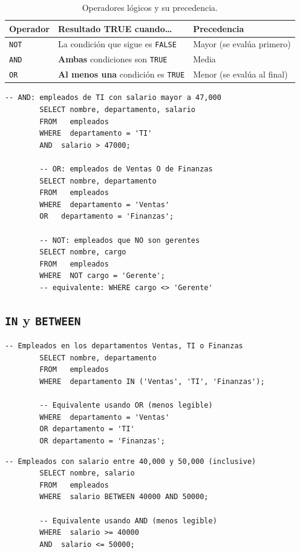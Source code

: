 \documentclass[12pt, a4paper]{article}
\begin{document}
	\begin{table}[H]
		\centering
		\small
		\renewcommand{\arraystretch}{1.5}
		\begin{tabularx}{\linewidth}{@{} l X X @{}}
			\toprule
			\textbf{Operador} & \textbf{Resultado TRUE cuando\ldots} & \textbf{Precedencia} \\
			\midrule
			\texttt{NOT} & La condición que sigue es \texttt{FALSE}
			& Mayor (se evalúa primero) \\
			\texttt{AND} & \textbf{Ambas} condiciones son \texttt{TRUE}
			& Media \\
			\texttt{OR}  & \textbf{Al menos una} condición es \texttt{TRUE}
			& Menor (se evalúa al final) \\
			\bottomrule
		\end{tabularx}
		\caption{Operadores lógicos y su precedencia.}
		\label{tab:operadores-logicos}
	\end{table}
	
	\begin{lstlisting}[caption={Uso de AND, OR y NOT.}]
		-- AND: empleados de TI con salario mayor a 47,000
		SELECT nombre, departamento, salario
		FROM   empleados
		WHERE  departamento = 'TI'
		AND  salario > 47000;
		
		-- OR: empleados de Ventas O de Finanzas
		SELECT nombre, departamento
		FROM   empleados
		WHERE  departamento = 'Ventas'
		OR   departamento = 'Finanzas';
		
		-- NOT: empleados que NO son gerentes
		SELECT nombre, cargo
		FROM   empleados
		WHERE  NOT cargo = 'Gerente';
		-- equivalente: WHERE cargo <> 'Gerente'
	\end{lstlisting}
	
	\subsection{\texttt{IN} y \texttt{BETWEEN}}
	
	\begin{lstlisting}[caption={IN para búsquedas en conjuntos.}]
		-- Empleados en los departamentos Ventas, TI o Finanzas
		SELECT nombre, departamento
		FROM   empleados
		WHERE  departamento IN ('Ventas', 'TI', 'Finanzas');
		
		-- Equivalente usando OR (menos legible)
		WHERE  departamento = 'Ventas'
		OR departamento = 'TI'
		OR departamento = 'Finanzas';
	\end{lstlisting}
	
	\begin{lstlisting}[caption={BETWEEN para rangos.}]
		-- Empleados con salario entre 40,000 y 50,000 (inclusive)
		SELECT nombre, salario
		FROM   empleados
		WHERE  salario BETWEEN 40000 AND 50000;
		
		-- Equivalente usando AND (menos legible)
		WHERE  salario >= 40000
		AND  salario <= 50000;
	\end{lstlisting}
	
\end{document}
